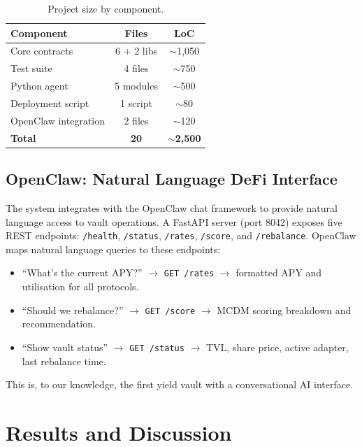 \documentclass[12pt]{article}
\begin{document}
\begin{table}[H]
\centering
\caption{Project size by component.}
\label{tab:loc}
\small
\begin{tabular}{@{}lcc@{}}
\toprule
\textbf{Component} & \textbf{Files} & \textbf{LoC} \\
\midrule
Core contracts         & 6 + 2 libs & $\sim$1{,}050 \\
Test suite             & 4 files    & $\sim$750 \\
Python agent           & 5 modules  & $\sim$500 \\
Deployment script      & 1 script   & $\sim$80 \\
OpenClaw integration   & 2 files    & $\sim$120 \\
\midrule
\textbf{Total}         & \textbf{20} & $\sim$\textbf{2{,}500} \\
\bottomrule
\end{tabular}
\end{table}

\subsection{OpenClaw: Natural Language DeFi Interface}
\label{sec:openclaw}

The system integrates with the OpenClaw chat framework to provide natural language access to vault operations.
A FastAPI server (port 8042) exposes five REST endpoints: \texttt{/health}, \texttt{/status}, \texttt{/rates}, \texttt{/score}, and \texttt{/rebalance}.
OpenClaw maps natural language queries to these endpoints:

\begin{itemize}[nosep]
  \item ``What's the current APY?'' $\to$ \texttt{GET /rates} $\to$ formatted APY and utilisation for all protocols.
  \item ``Should we rebalance?'' $\to$ \texttt{GET /score} $\to$ MCDM scoring breakdown and recommendation.
  \item ``Show vault status'' $\to$ \texttt{GET /status} $\to$ TVL, share price, active adapter, last rebalance time.
\end{itemize}

This is, to our knowledge, the first yield vault with a conversational AI interface.

\section{Results and Discussion}
\end{document}
